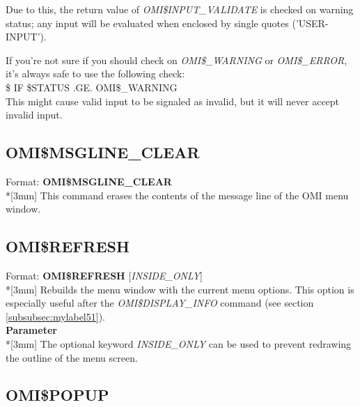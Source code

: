 \documentclass[a4paper]{book}
\newcommand{\vs}{\vspace{3mm}}
\renewcommand{\indent}{\hspace*{5mm}}
\begin{document}
Due to this, the return value of \textsl{OMI{\$}INPUT{\_}VALIDATE} is checked on warning status; any input 
will be evaluated when enclosed by single quotes ('USER-INPUT').

\vs

If you're not sure if you should check on \textsl{OMI{\$}{\_}WARNING} or 
\textsl{OMI{\$}{\_}ERROR}, it's always safe to use the following check: \\
\indent\textsf{{\$} IF {\$}STATUS .GE. OMI{\$}{\_}WARNING} \\
This might cause valid input to be signaled as invalid, but it will never 
accept invalid input.

\subsection{OMI{\$}MSGLINE{\_}CLEAR}
\label{subsubsec:mylabel57}

\indent Format: \textbf{OMI{\$}MSGLINE{\_}CLEAR}\\*[3mm]
This command erases the contents of the message line of the OMI menu window.

\subsection{OMI{\$}REFRESH}
\label{subsubsec:mylabel58}

\indent Format: \textbf{OMI{\$}REFRESH} [\textit{INSIDE{\_}ONLY}]\\*[3mm]
Rebuilds the menu window with the current menu options. This option is 
especially useful after the \textsl{OMI{\$}DISPLAY{\_}INFO} command (see section \ref{subsubsec:mylabel51}).\\[3mm]
\textbf{Parameter}\\*[3mm]
The optional keyword \textsl{INSIDE{\_}ONLY} can be used to prevent redrawing the outline of the menu screen.

\subsection{OMI{\$}POPUP}
\label{subsubsec:mylabel59}
\end{document}
